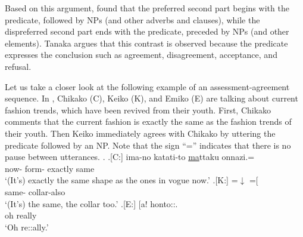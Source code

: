 Based on this argument,
 found that the preferred second part begins with the predicate, followed by NPs (and other adverbs and  clauses),
while the dispreferred second part ends with the predicate,
preceded by NPs (and other elements).
Tanaka argues that this contrast is observed because
the predicate expresses the conclusion such as agreement, disagreement, acceptance, and refusal.

Let us take a closer look at the following example of an assessment-agreement sequence.
In \Next,
Chikako (C), Keiko (K), and Emiko (E) are talking about current fashion trends, which have been revived from their youth.
First, Chikako comments that the current fashion is exactly the same as the fashion trends of their youth.
Then Keiko immediately agrees with Chikako
by uttering the predicate followed by an NP.
Note that the sign ``='' indicates that there is no pause between utterances.
%
\ex.
 \ag.[C:] ima-no katati-to \ul{ma}ttaku onnazi.= \\
                now- form- exactly same \\
                `(It's) exactly the same shape as the ones in vogue now.'
 \bg.[K:] =$\downarrow$ =[ \\
          \hspace{0.2cm}same- \hspace{0.3cm}collar-also \\
          `(It's) the same, the collar too.'
 \bg.[E:] {\hspace{2.5cm}} [a! honto::. \\
          {} oh really \\
          {\hspace{2.5cm}}`Oh re::ally.'
          \hfill{\cite[406]{tanaka05}}

